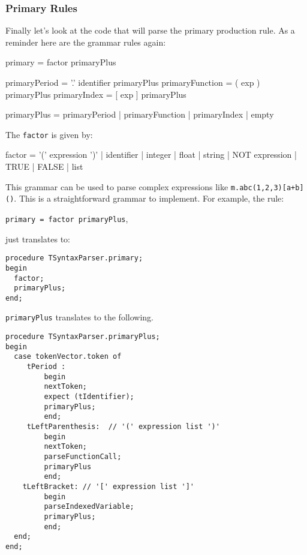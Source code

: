 \subsubsection*{Primary Rules}

Finally let's look at the code that will parse the primary production rule. As a reminder here are the grammar rules again:

\begin{small}
\begin{code}
primary           =  factor primaryPlus

primaryPeriod     = '.' identifier primaryPlus
primaryFunction   = ( exp ) primaryPlus
primaryIndex      = [ exp ] primaryPlus

primaryPlus       = primaryPeriod
                    | primaryFunction
                    | primaryIndex
                    | empty
\end{code}
\end{small}

The {\tt factor} is given by:

\begin{small}
\begin{code}
factor = '(' expression ')'
          | identifier
          | integer | float | string
          | NOT expression
          | TRUE | FALSE
          | list
\end{code}
\end{small}

This grammar can be used to parse complex expressions like {\tt m.abc(1,2,3)[a+b]()}. This is a straightforward grammar to implement. For example, the rule:

{\tt primary = factor primaryPlus},

just translates to:

\begin{lstlisting}
procedure TSyntaxParser.primary;
begin
  factor;
  primaryPlus;
end;
\end{lstlisting}

{\tt primaryPlus} translates to the following.

\begin{lstlisting}
procedure TSyntaxParser.primaryPlus;
begin
  case tokenVector.token of
     tPeriod :
         begin
         nextToken;
         expect (tIdentifier);
         primaryPlus;
         end;
     tLeftParenthesis:  // '(' expression list ')'
         begin
         nextToken;
         parseFunctionCall;
         primaryPlus
         end;
    tLeftBracket: // '[' expression list ']'
         begin
         parseIndexedVariable;
         primaryPlus;
         end;
  end;
end;
\end{lstlisting}

